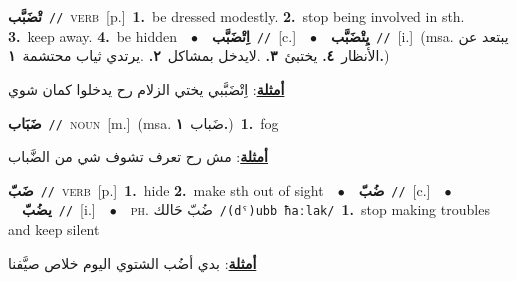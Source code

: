\documentclass[10pt,a4paper,twoside]{article} %
\begin{document}
\begin{multicols}{2}
{\setlength\topsep{0pt}\textbf{\foreignlanguage{arabic}{تْضَبَّب}}\ {\color{gray}\texttt{//}\color{black}}\ \textsc{verb}\ [p.]\ \textbf{1.}~be dressed modestly.  \textbf{2.}~stop being involved in sth.  \textbf{3.}~keep away.  \textbf{4.}~be hidden\ \ $\bullet$\ \ \setlength\topsep{0pt}\textbf{\foreignlanguage{arabic}{اِتْضَبَّب}}\ {\color{gray}\texttt{//}\color{black}}\ [c.]\ \ $\bullet$\ \ \setlength\topsep{0pt}\textbf{\foreignlanguage{arabic}{يِتْضَبَّب}}\ {\color{gray}\texttt{//}\color{black}}\ [i.]\ \color{gray}(msa. \foreignlanguage{arabic}{يبتعد عن الأنظار}~\foreignlanguage{arabic}{\textbf{٤.}}  \foreignlanguage{arabic}{يختبئ}~\foreignlanguage{arabic}{\textbf{٣.}}  .\foreignlanguage{arabic}{لايدخل بمشاكل}~\foreignlanguage{arabic}{\textbf{٢.}}  .\foreignlanguage{arabic}{يرتدي ثياب محتشمة}~\foreignlanguage{arabic}{\textbf{١.}})\color{black}\  \begin{flushright}\color{gray}\foreignlanguage{arabic}{\textbf{\underline{\foreignlanguage{arabic}{أمثلة}}}: اِتْضَبَّبي يختي الزلام رح يدخلوا كمان شوي}\end{flushright}\color{black}} \vspace{2mm}

{\setlength\topsep{0pt}\textbf{\foreignlanguage{arabic}{ضَبَاب}}\ {\color{gray}\texttt{//}\color{black}}\ \textsc{noun}\ [m.]\ \color{gray}(msa. \foreignlanguage{arabic}{ضَباب}~\foreignlanguage{arabic}{\textbf{١.}})\color{black}\ \textbf{1.}~fog\  \begin{flushright}\color{gray}\foreignlanguage{arabic}{\textbf{\underline{\foreignlanguage{arabic}{أمثلة}}}: مش رح تعرف تشوف شي من الضَّباب}\end{flushright}\color{black}} \vspace{2mm}

{\setlength\topsep{0pt}\textbf{\foreignlanguage{arabic}{ضَبّ}}\ {\color{gray}\texttt{//}\color{black}}\ \textsc{verb}\ [p.]\ \textbf{1.}~hide  \textbf{2.}~make sth out of sight\ \ $\bullet$\ \ \setlength\topsep{0pt}\textbf{\foreignlanguage{arabic}{ضُبّ}}\ {\color{gray}\texttt{//}\color{black}}\ [c.]\ \ $\bullet$\ \ \setlength\topsep{0pt}\textbf{\foreignlanguage{arabic}{يضُبّ}}\ {\color{gray}\texttt{//}\color{black}}\ [i.]\ \ $\bullet$\ \ \textsc{ph.} \color{gray} \foreignlanguage{arabic}{ضُبّ حَالك}\color{black}\ {\color{gray}\texttt{/{\sffamily (dˤ)ubb ħaːlak}/}\color{black}}\ \textbf{1.}~stop making troubles and keep silent\  \begin{flushright}\color{gray}\foreignlanguage{arabic}{\textbf{\underline{\foreignlanguage{arabic}{أمثلة}}}: بدي أضُب الشتوي اليوم خلاص صيَّفنا}\end{flushright}\color{black}} \vspace{2mm}


\end{multicols}
\end{document}
